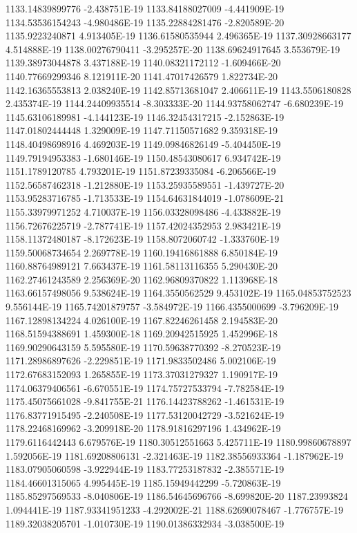 1133.14839899776  -2.438751E-19
1133.84188027009  -4.441909E-19
1134.53536154243  -4.980486E-19
1135.22884281476  -2.820589E-20
1135.9223240871  4.913405E-19
1136.61580535944  2.496365E-19
1137.30928663177  4.514888E-19
1138.00276790411  -3.295257E-20
1138.69624917645  3.553679E-19
1139.38973044878  3.437188E-19
1140.08321172112  -1.609466E-20
1140.77669299346  8.121911E-20
1141.47017426579  1.822734E-20
1142.16365553813  2.038240E-19
1142.85713681047  2.406611E-19
1143.5506180828  2.435374E-19
1144.24409935514  -8.303333E-20
1144.93758062747  -6.680239E-19
1145.63106189981  -4.144123E-19
1146.32454317215  -2.152863E-19
1147.01802444448  1.329009E-19
1147.71150571682  9.359318E-19
1148.40498698916  4.469203E-19
1149.09846826149  -5.404450E-19
1149.79194953383  -1.680146E-19
1150.48543080617  6.934742E-19
1151.1789120785  4.793201E-19
1151.87239335084  -6.206566E-19
1152.56587462318  -1.212880E-19
1153.25935589551  -1.439727E-20
1153.95283716785  -1.713533E-19
1154.64631844019  -1.078609E-21
1155.33979971252  4.710037E-19
1156.03328098486  -4.433882E-19
1156.72676225719  -2.787741E-19
1157.42024352953  2.983421E-19
1158.11372480187  -8.172623E-19
1158.8072060742  -1.333760E-19
1159.50068734654  2.269778E-19
1160.19416861888  6.850184E-19
1160.88764989121  7.663437E-19
1161.58113116355  5.290430E-20
1162.27461243589  2.256369E-20
1162.96809370822  1.113968E-18
1163.66157498056  9.538624E-19
1164.3550562529  9.453102E-19
1165.04853752523  9.556144E-19
1165.74201879757  -3.584972E-19
1166.4355000699  -3.796209E-19
1167.12898134224  4.026100E-19
1167.82246261458  2.194583E-20
1168.51594388691  1.459300E-18
1169.20942515925  1.452996E-18
1169.90290643159  5.595580E-19
1170.59638770392  -8.270523E-19
1171.28986897626  -2.229851E-19
1171.9833502486  5.002106E-19
1172.67683152093  1.265855E-19
1173.37031279327  1.190917E-19
1174.06379406561  -6.670551E-19
1174.75727533794  -7.782584E-19
1175.45075661028  -9.841755E-21
1176.14423788262  -1.461531E-19
1176.83771915495  -2.240508E-19
1177.53120042729  -3.521624E-19
1178.22468169962  -3.209918E-20
1178.91816297196  1.434962E-19
1179.6116442443  6.679576E-19
1180.30512551663  5.425711E-19
1180.99860678897  1.592056E-19
1181.69208806131  -2.321463E-19
1182.38556933364  -1.187962E-19
1183.07905060598  -3.922944E-19
1183.77253187832  -2.385571E-19
1184.46601315065  4.995445E-19
1185.15949442299  -5.720863E-19
1185.85297569533  -8.040806E-19
1186.54645696766  -8.699820E-20
1187.23993824  1.094441E-19
1187.93341951233  -4.292002E-21
1188.62690078467  -1.776757E-19
1189.32038205701  -1.010730E-19
1190.01386332934  -3.038500E-19
